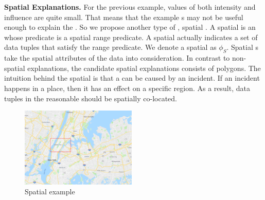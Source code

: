 {\bf Spatial Explanations.}
For the previous example, values of both intensity and influence are quite small. 
That means that the example {\explanation}s may not be useful enough to explain the {\fact}. 
So we propose another type of {\explanation}, spatial {\explanation}. 
A spatial {\explanation} is an {\explanation} whose predicate is a spatial range predicate. A spatial {\explanation} actually indicates a set of data tuples that satisfy the range predicate. We denote a spatial {\explanation} as $\phi_S$. 
Spatial {\explanation}s take the spatial attributes of the data into consideration. In contrast to non-spatial explanations, the candidate spatial explanations consists of polygons. 
The intuition behind the spatial {\explanation} is that a {\fact} can be caused by an incident. If an incident happens in a place, then it has an effect on a specific region. 
As a result, data tuples in the reasonable {\explanation} should be spatially co-located. 



\begin{figure}[t]
	\centering
	\includegraphics[width=0.49\textwidth]{images/spatial_explanation_map.eps}
	\caption{Spatial {\explanation} example}
	\label{fig:spatial_explanation_example}
\end{figure}

